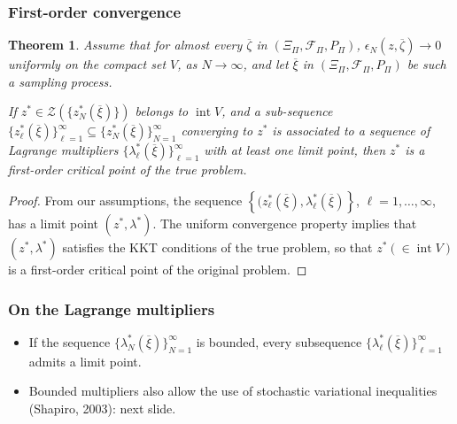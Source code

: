 \documentclass[aspectratio=169]{beamer}
\newtheorem{theo}{Theorem}
\begin{document}
\begin{frame}
\frametitle{First-order convergence}

\begin{small}

\begin{theo}
\label{th:fod_first}
Assume that for almost every $\overline \zeta$ in $(\Xi_{\Pi}, \mathcal{F}_{\Pi}, P_{\Pi})$, $\epsilon_N(z, \overline{\zeta}) \rightarrow 0$ uniformly on the compact set $V$, as $N \rightarrow \infty$, and let $\overline \xi$ in $(\Xi_{\Pi}, \mathcal{F}_{\Pi}, P_{\Pi})$ be such a sampling process.

If $z^* \in \mathcal{Z}\left(\lbrace z^*_N(\overline{\xi})\rbrace\right)$ belongs to $\operatorname{int} V$, and a sub-sequence $\lbrace z^*_{\ell}(\overline{\xi}) \rbrace_{\ell = 1}^{\infty} \subseteq \lbrace z^*_N (\overline{\xi}) \rbrace_{N = 1}^{\infty}$ converging to $z^*$ is associated to a sequence of Lagrange multipliers $\lbrace \lambda^*_{\ell} (\overline{\xi}) \rbrace_{\ell = 1}^{\infty}$ with at least one limit point, then $z^*$ is a first-order critical point of the true problem.
\end{theo}

\begin{proof}
From our assumptions, the sequence $\left\lbrace (z^*_{\ell}(\overline{\xi}), \lambda^*_{\ell}(\overline{\xi}) \right\rbrace$, $\ell=1,\ldots,\infty$, has a limit point $( z^*, \lambda^* )$.
The uniform convergence property implies that $( z^*, \lambda^* )$ satisfies the KKT conditions of the true problem, so that $z^* (\in \operatorname{int} V)$ is a first-order critical point of the original problem.
\end{proof}

\end{small}

\end{frame}

\begin{frame}
\frametitle{On the Lagrange multipliers}

\begin{itemize}
	\item 
If the sequence $\lbrace \lambda^*_N (\overline{\xi}) \rbrace_{N = 1}^{\infty}$ is bounded, every subsequence
$\lbrace \lambda^*_{\ell} (\overline{\xi}) \rbrace_{\ell = 1}^{\infty}$ admits a limit point.
\item 
Bounded multipliers also allow the use of stochastic variational inequalities (Shapiro, 2003): next slide.
\end{itemize}

\end{frame}
\end{document}
